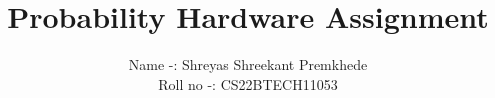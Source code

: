 \documentclass[journal,12pt,twocolumn]{IEEEtran}
\begin{document}
	\let\vec\mathbf
		
		
		
		
		\vspace{3cm}
		
		\title{
				Probability Hardware Assignment
		}
		\author{ Name -: Shreyas Shreekant Premkhede
			
			Roll no -: CS22BTECH11053
			
			
		}	
		
		
		
\end{document}

